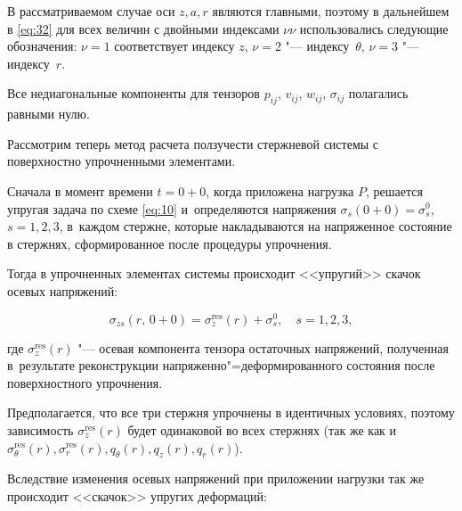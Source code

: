 В рассматриваемом случае оси $z, a, r$ являются главными, поэтому в дальнейшем в \eqref{eq:32} для всех величин с двойными индексами $\nu \nu$ использовались следующие обозначения: $\nu = 1$ соответствует индексу $z$, $\nu = 2$ "--- индексу~$\theta$, $\nu = 3$ "--- индексу~$r$.

Все недиагональные компоненты для тензоров $p_{ij}$, $ v _{ij}$, $w_{ij}$, $\sigma_{ij}$ полагались равными нулю.



Рассмотрим теперь метод расчета ползучести стержневой системы с поверхностно упрочненными элементами.

Сначала в момент времени $t=0+0$, когда приложена нагрузка $P$, решается упругая задача по схеме \eqref{eq:10} и~определяются напряжения $\sigma_s (0+0) = \sigma_s^{0}$, $s=1,2,3$, в~каждом стержне, которые накладываются на напряженное состояние в стержнях, сформированное после процедуры упрочнения.

Тогда в упрочненных элементах системы происходит <<упругий>> скачок осевых напряжений:

\begin{equation}

\label{eq:33}

\sigma_{z s} (r,\,0+0) = \sigma_z^{\text{res}}(r) + \sigma^0_s, \quad s=1,2,3,

\end{equation}

где $\sigma_z^{\text{res}}(r)$ "--- осевая компонента тензора остаточных напряжений, полученная в~результате реконструкции напряженно"=деформированного состояния после поверхностного упрочнения. 

Предполагается, что все три стержня упрочнены в идентичных условиях, поэтому зависимость $\sigma_z^{\text{res}} (r)$ будет одинаковой во всех стержнях (так же как и $\sigma_\theta^{\text{res}} (r), \sigma_r^{\text{res}} (r), q_\theta (r), q_z (r), q_r (r)$).



Вследствие изменения осевых напряжений при приложении нагрузки так же происходит <<скачок>> упругих деформаций:

